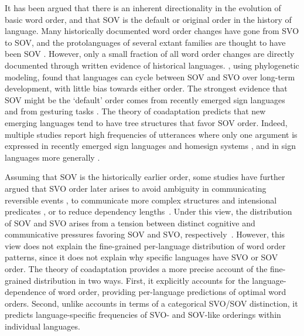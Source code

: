 \documentclass[9pt,twocolumn,twoside,lineno]{pnas-new}
\begin{document}
It has been argued that there is an inherent directionality in the evolution of basic word order, and that SOV is the default or original order in the history of language.
Many historically documented word order changes have gone from SVO to SOV, and the protolanguages of several extant families are thought to have been SOV \citep{givon1979understanding, newmeyer2000evolutionary, maurits2014tracing}.
However, only a small fraction of all word order changes are directly documented through written evidence of historical languages. \cite{maurits2014tracing}, using phylogenetic modeling, found that languages can cycle between SOV and SVO over long-term development, with little bias towards either order.
The strongest evidence that SOV might be the `default' order comes from recently emerged sign languages \citep{senghas1997argument, sandler2005emergence, goldin-meadow1998spontaneous, meir2010emerging} and from gesturing tasks \citep{goldin-meadow2008natural, langus2010cognitive}.
The theory of coadaptation predicts that new emerging languages tend to have tree structures that favor SOV order.
Indeed, multiple studies report high frequencies of utterances where only one argument is expressed in recently emerged sign languages and homesign systems \citep{sandler2005emergence, goldin-meadow1998spontaneous, neveu2016sign, ergin2018development}, and in sign languages more generally \citep{napoli2014order}.


Assuming that SOV is the historically earlier order, some studies have further argued that SVO order later arises to avoid ambiguity in communicating reversible events \citep{gibson-noisy-channel-2013, hall2013cognitive}, to communicate more complex structures \citep{langus2010cognitive, marno2015a, ferrer-i-cancho-placement-2017} and intensional predicates \citep{schouwstra-semantic-2011,napoli2017influence}, or to reduce dependency lengths~\citep{ferrer-i-cancho-placement-2017}.
Under this view, the distribution of SOV and SVO arises from a tension between distinct cognitive and communicative pressures favoring SOV and SVO, respectively~\citep{langus2010cognitive}.
However, this view does not explain the fine-grained per-language distribution of word order patterns, since it does not explain why specific languages have SVO or SOV order.
The theory of coadaptation provides a more precise account of the fine-grained distribution in two ways. First, it explicitly accounts for the language-dependence of word order, providing per-language predictions of optimal word orders.
Second, unlike accounts in terms of a categorical SVO/SOV distinction, it predicts language-specific frequencies of SVO- and SOV-like orderings within individual languages.
\end{document}
